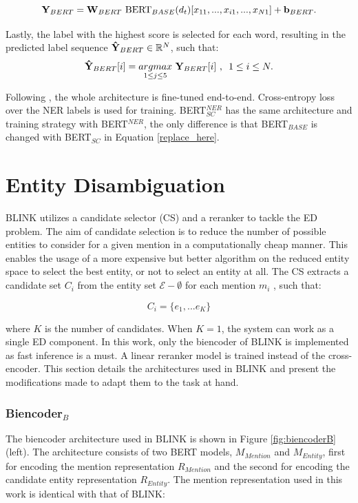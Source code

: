 \documentclass{report}
\theoremstyle{definition}
\theoremstyle{remark}
\begin{document}
\begin{equation}
\label{replace_here}
   \bold{Y}_{BERT} = \bold{W}_{BERT} \ \text{BERT}_{BASE}(d_t)[x_{11},...,x_{i1},...,x_{N1}] + \bold{b}_{BERT}.
\end{equation}

Lastly, the label with the highest score is selected for each word, resulting in the predicted label sequence $\bold{\Hat{Y}}_{BERT} \in \mathbb{R}^N$, such that:
\begin{equation}
    \bold{\Hat{Y}}_{BERT}[i] = \underset{1\leq j\leq5}{argmax} \ \bold{Y}_{BERT} [i] \ \text{, } \ 1\leq i \leq N. 
\end{equation}

Following \cite{BERT}, the whole architecture is fine-tuned end-to-end. Cross-entropy loss over the NER labels is used for training. BERT$^{NER}_{SC}$ has the same architecture and training strategy with BERT$^{NER}$, the only difference is that BERT$_{BASE}$ is changed with BERT$_{SC}$ in Equation \ref{replace_here}.

\section{Entity Disambiguation}
\label{sec:entdismethod}
BLINK utilizes a candidate selector (CS) and a reranker to tackle the ED problem. The aim of candidate selection is to reduce the number of possible entities to consider for a given mention in a computationally cheap manner. This enables the usage of a more expensive but better algorithm on the reduced entity space to select the best entity, or not to select an entity at all. The CS extracts a candidate set $C_i$ from the entity set $\mathcal{E} - \emptyset$ for each mention $m_i$ , such that:

\begin{equation}
    C_i = \{e_1,...e_K\} 
\end{equation}

\noindent where $K$ is the number of candidates. When $K=1$, the system can work as a single ED component. In this work, only the biencoder of BLINK is implemented as fast inference is a must. A linear reranker model is trained instead of the cross-encoder. This section details the architectures used in BLINK and present the modifications made to adapt them to the task at hand.

\subsubsection{Biencoder$_{B}$}
\label{sec:biencoderbexplanation}
The biencoder architecture used in BLINK is shown in Figure \ref{fig:biencoderB} (left). The architecture consists of two BERT models, $M_{Mention}$ and $M_{Entity}$, first for encoding the mention representation $R_{Mention}$ and the second for encoding the candidate entity representation $R_{Entity}$. The mention representation used in this work is identical with that of BLINK:
\end{document}
